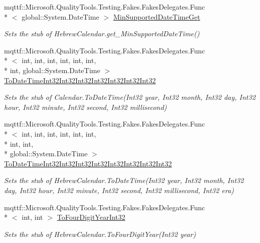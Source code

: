 \begin{DoxyCompactItemize}
mqttf\-::\-Microsoft.\-Quality\-Tools.\-Testing.\-Fakes.\-Fakes\-Delegates.\-Func\\*
$<$ global\-::\-System.\-Date\-Time $>$ \hyperlink{class_system_1_1_globalization_1_1_fakes_1_1_stub_hebrew_calendar_a16bbb52cba3d29349bf7439cf97898e5}{Min\-Supported\-Date\-Time\-Get}
\begin{DoxyCompactList}\small\item\em Sets the stub of Hebrew\-Calendar.\-get\-\_\-\-Min\-Supported\-Date\-Time()\end{DoxyCompactList}\item 
mqttf\-::\-Microsoft.\-Quality\-Tools.\-Testing.\-Fakes.\-Fakes\-Delegates.\-Func\\*
$<$ int, int, int, int, int, int, \\*
int, global\-::\-System.\-Date\-Time $>$ \hyperlink{class_system_1_1_globalization_1_1_fakes_1_1_stub_hebrew_calendar_aecc9129654fcaf384fbaedb18735bf70}{To\-Date\-Time\-Int32\-Int32\-Int32\-Int32\-Int32\-Int32\-Int32}
\begin{DoxyCompactList}\small\item\em Sets the stub of Calendar.\-To\-Date\-Time(\-Int32 year, Int32 month, Int32 day, Int32 hour, Int32 minute, Int32 second, Int32 millisecond)\end{DoxyCompactList}\item 
mqttf\-::\-Microsoft.\-Quality\-Tools.\-Testing.\-Fakes.\-Fakes\-Delegates.\-Func\\*
$<$ int, int, int, int, int, int, \\*
int, int, \\*
global\-::\-System.\-Date\-Time $>$ \hyperlink{class_system_1_1_globalization_1_1_fakes_1_1_stub_hebrew_calendar_add035a2790291e034719fe9b83f4fb53}{To\-Date\-Time\-Int32\-Int32\-Int32\-Int32\-Int32\-Int32\-Int32\-Int32}
\begin{DoxyCompactList}\small\item\em Sets the stub of Hebrew\-Calendar.\-To\-Date\-Time(\-Int32 year, Int32 month, Int32 day, Int32 hour, Int32 minute, Int32 second, Int32 millisecond, Int32 era)\end{DoxyCompactList}\item 
mqttf\-::\-Microsoft.\-Quality\-Tools.\-Testing.\-Fakes.\-Fakes\-Delegates.\-Func\\*
$<$ int, int $>$ \hyperlink{class_system_1_1_globalization_1_1_fakes_1_1_stub_hebrew_calendar_a58df4569917e5f68485dbcb57b6d1b0c}{To\-Four\-Digit\-Year\-Int32}
\begin{DoxyCompactList}\small\item\em Sets the stub of Hebrew\-Calendar.\-To\-Four\-Digit\-Year(\-Int32 year)\end{DoxyCompactList}\item 

\end{DoxyCompactItemize}
